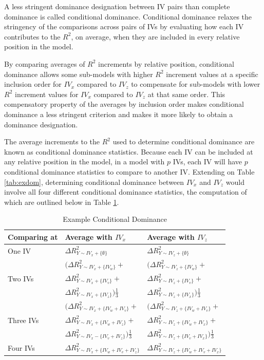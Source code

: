 \documentclass[man]{apa7}
\begin{document}
	A less stringent dominance designation between IV pairs than complete dominance is called conditional dominance.
	Conditional dominance relaxes the stringency of the comparisons across pairs of IVs by evaluating how each IV contributes to the $R^2$, on average, when they are included in every relative position in the model.
	
	By comparing averages of $R^2$ increments by relative position, conditional dominance allows some sub-models with higher $R^2$ increment values at a specific inclusion order for $IV_x$ compared to $IV_z$ to compensate for sub-models with lower $R^2$ increment values for $IV_x$ compared to $IV_z$ at that same order.
	This compensatory property of the averages by inclusion order makes conditional dominance a less stringent criterion and makes it more likely to obtain a dominance designation.
	
	The average increments to the $R^2$ used to determine conditional dominance are known as conditional dominance statistics.
	Because each IV can be included at any relative position in the model, in a model with $p$ IVs, each IV will have $p$ conditional dominance statistics to compare to another IV.
	Extending on Table \ref{tab:exdom}, determining conditional dominance between $IV_x$ and $IV_z$ would involve all four different conditional dominance statistics, the computation of which are outlined below in Table \ref{tab:excdl}.
	
	\begin{table}[h!]
		\centering
		\caption{\centering Example Conditional Dominance}
		\begin{tabular}{ l | l l }
			Comparing at & Average with $IV_x$ & Average with $IV_z$ \\
			\hline
			One IV & $\Delta R^2_{Y \sim IV_x + \{\emptyset\}}$ & $\Delta R^2_{Y \sim IV_z + \{\emptyset\}}$ \\
			\hline
			& $(\Delta R^2_{Y \sim IV_x + \{IV_w\}} + $ & $(\Delta R^2_{Y \sim IV_z + \{IV_w\}} + $ \\
			Two IVs & $\Delta R^2_{Y \sim IV_x + \{IV_v\}} + $ & $\Delta R^2_{Y \sim IV_z + \{IV_v\}} + $ \\
			& $\Delta R^2_{Y \sim IV_x + \{IV_z\}})\frac{1}{3}$ & $\Delta R^2_{Y \sim IV_z + \{IV_x\}})\frac{1}{3} $ \\
			\hline
			& $(\Delta R^2_{Y \sim IV_x + \{IV_w + IV_v\}} + $ & $(\Delta R^2_{Y \sim IV_z + \{IV_w + IV_v\}} + $ \\
			Three IVs & $\Delta R^2_{Y \sim IV_x + \{IV_w + IV_z\}} + $ & $\Delta R^2_{Y \sim IV_z + \{IV_w + IV_x\}} + $ \\
			& $\Delta R^2_{Y \sim IV_x - \{IV_v + IV_z\}})\frac{1}{3}$ & $\Delta R^2_{Y \sim IV_z + \{IV_v + IV_x\}})\frac{1}{3}$ \\
			\hline
			Four IVs & $\Delta R^2_{Y \sim IV_x + \{IV_w + IV_v + IV_z\}}$ & $\Delta R^2_{Y \sim IV_z + \{IV_w + IV_v + IV_x\}}$ \\
			\hline
		\end{tabular}
		\label{tab:excdl}
	\end{table}
	
\end{document}
